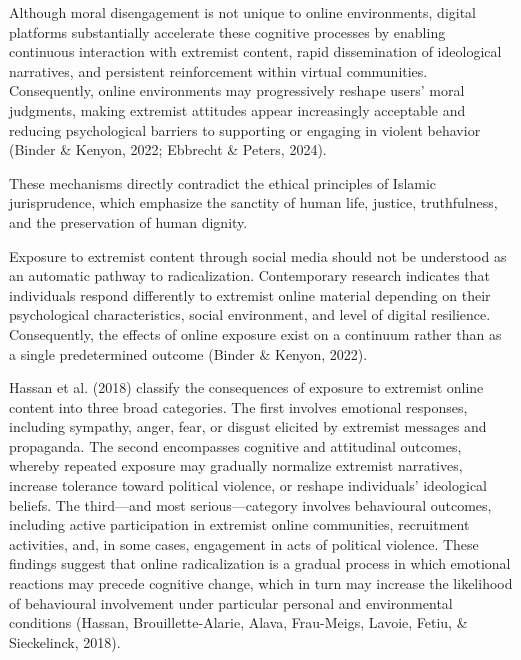 \documentclass{NSP1}
\begin{document}
Although moral disengagement is not unique to online environments, digital platforms substantially accelerate these cognitive processes by enabling continuous interaction with extremist content, rapid dissemination of ideological narratives, and persistent reinforcement within virtual communities. Consequently, online environments may progressively reshape users' moral judgments, making extremist attitudes appear increasingly acceptable and reducing psychological barriers to supporting or engaging in violent behavior (Binder \& Kenyon, 2022; Ebbrecht \& Peters, 2024).

These mechanisms directly contradict the ethical principles of Islamic jurisprudence, which emphasize the sanctity of human life, justice, truthfulness, and the preservation of human dignity.

\par\medskip{}\smallskip

Exposure to extremist content through social media should not be understood as an automatic pathway to radicalization. Contemporary research indicates that individuals respond differently to extremist online material depending on their psychological characteristics, social environment, and level of digital resilience. Consequently, the effects of online exposure exist on a continuum rather than as a single predetermined outcome (Binder \& Kenyon, 2022).

Hassan et al. (2018) classify the consequences of exposure to extremist online content into three broad categories. The first involves emotional responses, including sympathy, anger, fear, or disgust elicited by extremist messages and propaganda. The second encompasses cognitive and attitudinal outcomes, whereby repeated exposure may gradually normalize extremist narratives, increase tolerance toward political violence, or reshape individuals' ideological beliefs. The third—and most serious—category involves behavioural outcomes, including active participation in extremist online communities, recruitment activities, and, in some cases, engagement in acts of political violence. These findings suggest that online radicalization is a gradual process in which emotional reactions may precede cognitive change, which in turn may increase the likelihood of behavioural involvement under particular personal and environmental conditions (Hassan, Brouillette-Alarie, Alava, Frau-Meigs, Lavoie, Fetiu, \& Sieckelinck, 2018).
\end{document}
